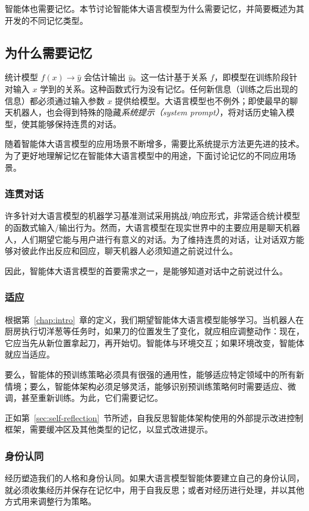 智能体也需要记忆。本节讨论智能体大语言模型为什么需要记忆，并简要概述为其开发的不同记忆类型。

\subsection{为什么需要记忆}
统计模型 $f(x) \rightarrow \hat{y}$ 会估计输出 $\hat{y}$。这一估计基于关系 $f$，即模型在训练阶段针对输入 $x$ 学到的关系。这种函数式行为没有记忆。任何新信息（训练之后出现的信息）都必须通过输入参数 $x$ 提供给模型。大语言模型也不例外；即使最早的聊天机器人，也会得到特殊的隐藏{\em 系统提示（system prompt）}，将对话历史输入模型，使其能够保持连贯的对话。

随着智能体大语言模型的应用场景不断增多，需要比系统提示方法更先进的技术。
为了更好地理解记忆在智能体大语言模型中的用途，下面讨论记忆的不同应用场景。

\subsubsection{连贯对话}
许多针对大语言模型的机器学习基准测试采用挑战/响应形式，非常适合统计模型的函数式输入/输出行为。然而，大语言模型在现实世界中的主要应用是聊天机器人，人们期望它能与用户进行有意义的对话。为了维持连贯的对话，让对话双方能够对彼此作出反应和回应，聊天机器人必须知道之前说过什么。

因此，智能体大语言模型的首要需求之一，是能够知道对话中之前说过什么。



\subsubsection{适应}
根据第~\ref{chap:intro}~章的定义，我们期望智能体大语言模型能够学习。当机器人在厨房执行切洋葱等任务时，如果刀的位置发生了变化，就应相应调整动作：现在，它应当先从新位置拿起刀，再开始切。智能体与环境交互；如果环境改变，智能体就应当适应。

要么，智能体的预训练策略必须具有很强的通用性，能够适应特定领域中的所有新情境；要么，智能体架构必须足够灵活，能够识别预训练策略何时需要适应、微调，甚至重新训练。为此，它们需要记忆。

正如第~\ref{sec:self-reflection}~节所述，自我反思智能体架构使用的外部提示改进控制框架，需要缓冲区及其他类型的记忆，以显式改进提示。

\subsubsection{身份认同}
经历塑造我们的人格和身份认同。如果大语言模型智能体要建立自己的身份认同，就必须收集经历并保存在记忆中，用于自我反思；或者对经历进行处理，并以其他方式用来调整行为策略。


